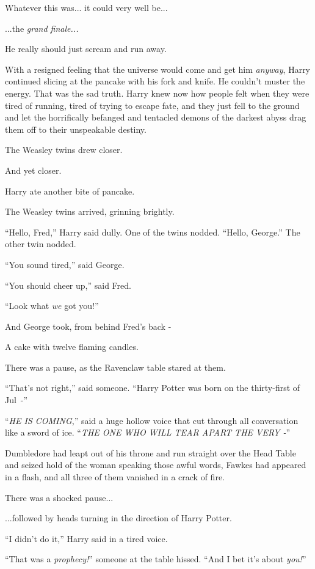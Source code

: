 Whatever this was... it could very well be...

...the \emph{grand finale...}

He really should just scream and run away.

With a resigned feeling that the universe would come and get him \emph{anyway}, Harry continued slicing at the pancake with his fork and knife. He couldn't muster the energy. That was the sad truth. Harry knew now how people felt when they were tired of running, tired of trying to escape fate, and they just fell to the ground and let the horrifically befanged and tentacled demons of the darkest abyss drag them off to their unspeakable destiny.

The Weasley twins drew closer.

And yet closer.

Harry ate another bite of pancake.

The Weasley twins arrived, grinning brightly.

``Hello, Fred,'' Harry said dully. One of the twins nodded. ``Hello, George.'' The other twin nodded.

``You sound tired,'' said George.

``You should cheer up,'' said Fred.

``Look what \emph{we} got you!''

And George took, from behind Fred's back -

A cake with twelve flaming candles.

There was a pause, as the Ravenclaw table stared at them.

``That's not right,'' said someone. ``Harry Potter was born on the thirty-first of Jul~-''

``\emph{HE IS COMING},'' said a huge hollow voice that cut through all conversation like a sword of ice. ``\emph{THE ONE WHO WILL TEAR APART THE VERY -}''

Dumbledore had leapt out of his throne and run straight over the Head Table and seized hold of the woman speaking those awful words, Fawkes had appeared in a flash, and all three of them vanished in a crack of fire.

There was a shocked pause...

...followed by heads turning in the direction of Harry Potter.

``I didn't do it,'' Harry said in a tired voice.

``That was a \emph{prophecy!}'' someone at the table hissed. ``And I bet it's about \emph{you!}''

